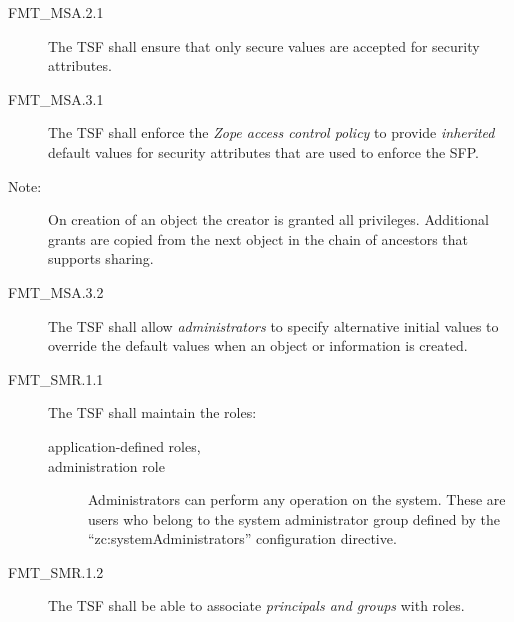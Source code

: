 \documentclass[12pt,english]{scrbook}
\begin{document}

\begin{description}

\item[FMT{\_}MSA.2.1]

    The TSF shall ensure that only secure values are accepted for security
    attributes.
\end{description}




\begin{description}

\item[FMT{\_}MSA.3.1]


The TSF shall enforce the \emph{Zope access control policy} to provide 
\emph{inherited} default values for security attributes that are used to 
enforce the SFP. 

\item[Note:] On creation of an object the creator is granted all privileges.
  Additional grants are copied from the next object in the chain of ancestors
  that supports sharing.

\item[FMT{\_}MSA.3.2 ]

The TSF shall allow \emph{administrators} to specify alternative
initial values to override the default values when an object or
information is created.

\end{description}






\begin{description}
    \item[FMT{\_}SMR.1.1]

    The TSF shall maintain the roles:
\begin{description}
\item[application-defined roles,]

\item[administration role]

Administrators can perform any operation on the system. These are users who
belong to the system administrator group defined by the
``zc:systemAdministrators'' configuration directive.

\end{description}

\item[FMT{\_}SMR.1.2]

The TSF shall be able to associate \emph{principals and groups} with roles.

\end{description}
\end{document}
